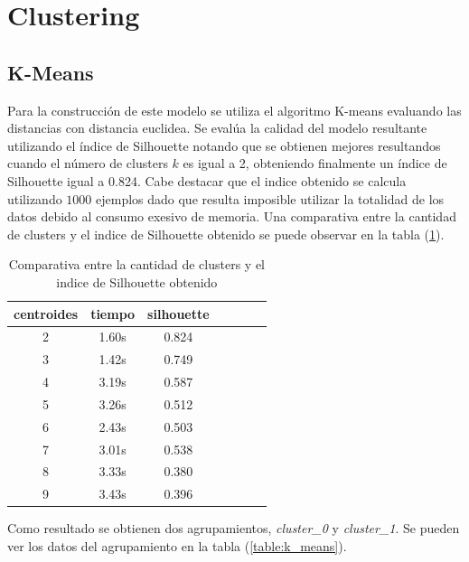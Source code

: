 \documentclass[osajnl,twocolumn,showpacs,superscriptaddress,10pt]{revtex4-1} %
\begin{document}
\section{Clustering}

\subsection{K-Means}

Para la construcción de este modelo se utiliza el algoritmo K-means evaluando las distancias con distancia euclidea. Se evalúa la calidad del modelo resultante utilizando el índice de Silhouette notando que se obtienen mejores resultandos cuando el número de clusters $k$ es igual a 2, obteniendo finalmente un índice de Silhouette igual a 0.824. Cabe destacar que el indice obtenido se calcula utilizando $1000$ ejemplos dado que resulta imposible utilizar la totalidad de los datos debido al consumo exesivo de memoria. Una comparativa entre la cantidad de clusters y el indice de Silhouette obtenido se puede observar en la tabla (\ref{table:clusters_silhouette}). \\

\begin{table}[h!]
    \centering
    \begin{tabular}{ccccccc}
        centroides & tiempo & silhouette \\
        \hline
        2 & 1.60s	& 0.824 \\
        3 & 1.42s	& 0.749 \\
        4 & 3.19s	& 0.587 \\
        5 & 3.26s	& 0.512 \\
        6 & 2.43s	& 0.503 \\
        7 & 3.01s	& 0.538 \\
        8 & 3.33s	& 0.380 \\
        9 & 3.43s	& 0.396 \\
        \hline
    \end{tabular}
    \caption{Comparativa entre la cantidad de clusters y el indice de Silhouette obtenido}
    \label{table:clusters_silhouette}
\end{table}

Como resultado se obtienen dos agrupamientos, \textit{cluster\_0} y \textit{cluster\_1}. Se pueden ver los datos del agrupamiento en la tabla (\ref{table:k_means}).
\end{document}

